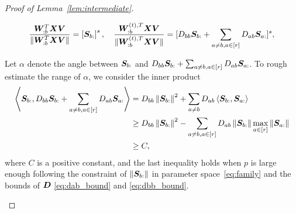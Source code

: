 \documentclass[lettersize,onecolumn,journal]{IEEEtran}
\theoremstyle{definition}
\theoremstyle{definition}
\newcommand{\off}[1]{\left[#1\right]}
\newcommand{\offf}[1]{\left\{#1\right\}}
\newcommand{\ang}[1]{\left\langle#1\right\rangle}
\begin{document}
\begin{proof}[Proof of Lemma~\ref{lem:intermediate}]
\begin{enumerate}
    \begin{equation}
        \frac{ \mW_{:b}^T \mX \mV  }{\onormSize{}{  \mW_{:b}^T \mX \mV }} = \off{\mS_{b:}}^s, \quad \frac{ \mW_{:b}^{(t), T} \mX \mV  }{ \onormSize{}{\mW_{:b}^{(t), T} \mX \mV }} = [D_{bb} \mS_{b:} + \sum_{a \neq b, a \in [r]} D_{ab} \mS_{a:}]^s, 
    \end{equation}
    
    Let $\alpha$ denote the angle between $\bm S_{b:}$ and $D_{bb} \bm S_{b:} + \sum_{a \neq b, a \in [r]} D_{ab} \bm S_{a:}$. To rough estimate the range of $\alpha$, we consider the inner product 
    \begin{align}
        \ang{\mS_{b:},  D_{bb} \mS_{b:} + \sum_{a \neq b, a \in [r]} D_{ab} \mS_{a:}}  &= D_{bb} \onorm{\mS_{b:}}^2 + \sum_{a \neq b} D_{ab}\ang{\mS_{b:}, \mS_{a:}}\\
        &\geq D_{bb} \onorm{\mS_{b:}}^2 -  \sum_{a \neq b, a \in [r]} D_{ab}   \onorm{\mS_{b:}} \max_{a \in [r]}  \onorm{\mS_{a:}} \\
        & \geq C,
    \end{align}
    where $C$ is a positive constant, and the last inequality holds when $p$ is large enough following the constraint of $\left\lVert\bm S_{b:}\right\rVert$ in parameter space~\eqref{eq:family} and the bounds of $\bm{D}$ \eqref{eq:dab_bound} and \eqref{eq:dbb_bound}.
    

\end{enumerate}
\end{proof}
\end{document}
